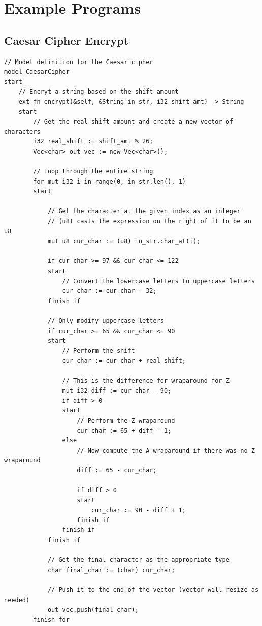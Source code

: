 \documentclass[letterpaper, 10pt, DIV=13]{scrartcl}
\numberwithin{equation}{section}
\numberwithin{figure}{section}
\numberwithin{table}{section}
\begin{document}
\section{Example Programs}
\subsection{Caesar Cipher Encrypt}
\begin{lstlisting}[caption = CaesarCipher.rez, frame = single, nolol]
// Model definition for the Caesar cipher
model CaesarCipher
start
    // Encryt a string based on the shift amount
    ext fn encrypt(&self, &String in_str, i32 shift_amt) -> String
    start
        // Get the real shift amount and create a new vector of characters
        i32 real_shift := shift_amt % 26;
        Vec<char> out_vec := new Vec<char>();

        // Loop through the entire string
        for mut i32 i in range(0, in_str.len(), 1)
        start
            
            // Get the character at the given index as an integer
            // (u8) casts the expression on the right of it to be an u8
            mut u8 cur_char := (u8) in_str.char_at(i);

            if cur_char >= 97 && cur_char <= 122
            start
                // Convert the lowercase letters to uppercase letters
                cur_char := cur_char - 32;
            finish if

            // Only modify uppercase letters
            if cur_char >= 65 && cur_char <= 90
            start
                // Perform the shift
                cur_char := cur_char + real_shift;

                // This is the difference for wraparound for Z
                mut i32 diff := cur_char - 90;
                if diff > 0
                start
                    // Perform the Z wraparound
                    cur_char := 65 + diff - 1;
                else
                    // Now compute the A wraparound if there was no Z wraparound
                    diff := 65 - cur_char;

                    if diff > 0
                    start
                        cur_char := 90 - diff + 1;
                    finish if
                finish if
            finish if
            
            // Get the final character as the appropriate type
            char final_char := (char) cur_char;

            // Push it to the end of the vector (vector will resize as needed)
            out_vec.push(final_char);
        finish for


\end{lstlisting}
\end{document}
